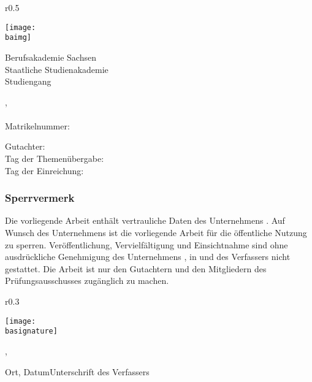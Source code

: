 \documentclass[ngerman,12pt]{article}
\begin{document}
\begin{titlepage}
	\begin{wrapfigure}[3]{r}{0.5\textwidth}
		\begin{center}
			\vspace{-18pt}
			\texttt{[image: \\baimg]}
		\end{center}
	\end{wrapfigure}
	\noindent
	\normalsize
	Berufsakademie Sachsen \\ Staatliche Studienakademie \baplace{} \\ Studiengang \badepartment{} \\
	\par
	\vspace{5cm}
	\begin{center}
		\Huge
		\textbf{\batitle{}}
		\par
		\vspace{4cm}
		\normalsize
		\balastname{}, \bafirstname{} \\
		\bacompany{}\\
		Matrikelnummer: \banumber{}
	\end{center}
	\vfill
	Gutachter: \bacorrector{}\\[\baselineskip]
	Tag der Themenübergabe: \bathemedate{} \\
	Tag der Einreichung: \bareturndate{}
\end{titlepage}
\addtocounter{page}{1}
\newpage

\subsubsection*{Sperrvermerk}
Die vorliegende Arbeit enthält vertrauliche Daten des Unternehmens \bacompany{}.
Auf Wunsch des Unternehmens \bacompany{} ist die vorliegende Arbeit für die öffentliche Nutzung zu sperren.
Veröffentlichung, Vervielfältigung und Einsichtnahme sind ohne ausdrückliche Genehmigung des Unternehmens \bacompany{}, in \bacompanyplace{} und des Verfassers \bafirstname{} \balastname{} nicht gestattet.
Die Arbeit ist nur den Gutachtern und den Mitgliedern des Prüfungsausschusses zugänglich zu machen.
\bigskip\par
\begin{wrapfigure}[1]{r}{0.3\textwidth}
	\begin{center}
		\vspace{-64pt}
		\texttt{[image: \\basignature]}
	\end{center}
\end{wrapfigure}
\bigskip\bigskip
\par\noindent
\baplace{}, \bareturndate{}
\bigskip
\par\noindent
Ort, Datum\hfill Unterschrift des Verfassers
\newpage
\end{document}
